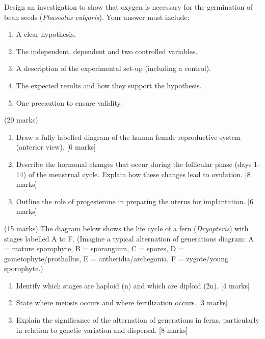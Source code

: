 \documentclass[11pt]{article}
\newcounter{popsec}
\newcounter{popsub}
\newcommand{\courssub}[1]{%
  \stepcounter{popsub}%
  \par\vspace{9pt}\noindent{\popxbold\fontsize{11.5}{13}\selectfont\color{popink}{\color{poporange}\thepopsec.\thepopsub}\hspace{6pt}#1}\par\nopagebreak\vspace{4pt}
}
\begin{document}
\begin{exercice}
Design an investigation to show that oxygen is necessary for the germination of bean seeds (\emph{Phaseolus vulgaris}). Your answer must include:
\begin{enumerate}
\item A clear hypothesis.
\item The independent, dependent and two controlled variables.
\item A description of the experimental set-up (including a control).
\item The expected results and how they support the hypothesis.
\item One precaution to ensure validity.
\end{enumerate}
\end{exercice}

\courssub{I prepare for the GCE}

\begin{exercice} (20 marks)
\begin{enumerate}
\item Draw a fully labelled diagram of the human female reproductive system (anterior view). [6 marks]
\item Describe the hormonal changes that occur during the follicular phase (days 1–14) of the menstrual cycle. Explain how these changes lead to ovulation. [8 marks]
\item Outline the role of progesterone in preparing the uterus for implantation. [6 marks]
\end{enumerate}
\end{exercice}

\begin{exercice} (15 marks)
The diagram below shows the life cycle of a fern (\emph{Dryopteris}) with stages labelled A to F. (Imagine a typical alternation of generations diagram: A = mature sporophyte, B = sporangium, C = spores, D = gametophyte/prothallus, E = antheridia/archegonia, F = zygote/young sporophyte.)

\begin{enumerate}
\item Identify which stages are haploid (n) and which are diploid (2n). [4 marks]
\item State where meiosis occurs and where fertilization occurs. [3 marks]
\item Explain the significance of the alternation of generations in ferns, particularly in relation to genetic variation and dispersal. [8 marks]
\end{enumerate}
\end{exercice}
\end{document}
